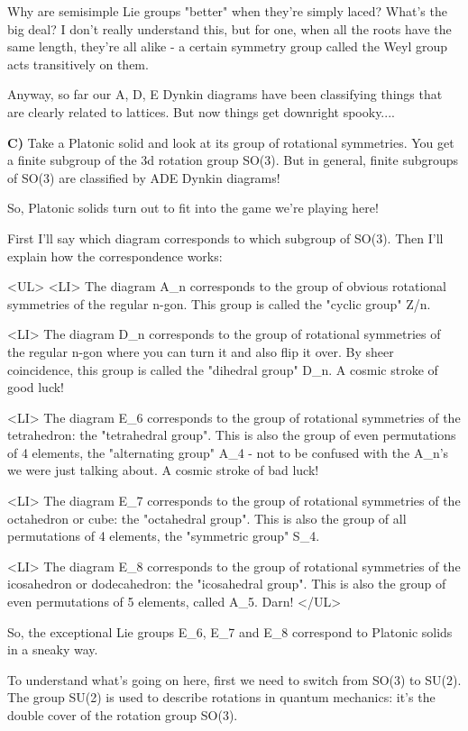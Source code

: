 Why are semisimple Lie groups "better" when they're simply laced?
What's the big deal?  I don't really understand this, but for one,
when all the roots have the same length, they're all alike - 
a certain symmetry group called the Weyl group acts transitively on them.  

Anyway, so far our A, D, E Dynkin diagrams have been classifying
things that are clearly related to lattices.  But now things get
downright spooky....

\textbf{C)} 
Take a Platonic solid and look at its group of rotational symmetries.
You get a finite subgroup of the 3d rotation group SO(3).  But in 
general, finite subgroups of SO(3) are classified by ADE Dynkin 
diagrams!  

So, Platonic solids turn out to fit into the game we're playing here!

First I'll say which diagram corresponds to which subgroup of SO(3).
Then I'll explain how the correspondence works:

<UL>
<LI>
 The diagram A_{n} corresponds to the group of obvious rotational symmetries
  of the regular n-gon.  This group is called the "cyclic group" Z/n.

<LI>
 The diagram D_{n} corresponds to the group of rotational symmetries 
  of the regular n-gon where you can turn it and also flip it over.
  By sheer coincidence, this group is called the "dihedral group" D_{n}. 
  A cosmic stroke of good luck!

<LI>
 The diagram E_{6} corresponds to the group of rotational symmetries 
  of the tetrahedron: the "tetrahedral group".  This is also the 
  group of even permutations of 4 elements, the "alternating group"
  A_{4} - not to be
  confused with the A_{n}'s we were just talking about.  A cosmic 
  stroke of bad luck!

<LI>
 The diagram E_{7} corresponds to the group of rotational symmetries
  of the octahedron or cube: the "octahedral group".  This is also 
  the group of all permutations of 4 elements, the "symmetric
  group" S_{4}.  

<LI>
 The diagram E_{8} corresponds to the group of rotational symmetries
  of the icosahedron or dodecahedron: the "icosahedral group".  This 
  is also the group of even permutations of 5 elements, called A_{5}.  
 Darn!
</UL>

So, the exceptional Lie groups E_{6}, E_{7} and E_{8} correspond to Platonic
solids in a sneaky way.  

To understand what's going on here, first we need to switch from SO(3)
to SU(2).  The group SU(2) is used to describe rotations in quantum 
mechanics: it's the double cover of the rotation group SO(3).  

